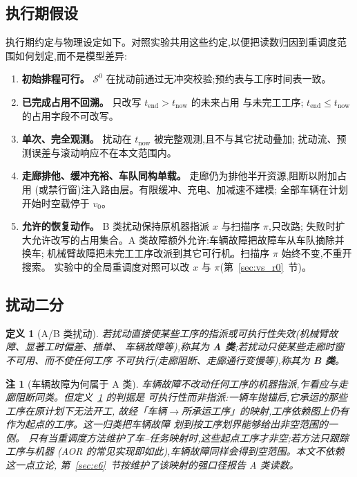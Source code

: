 \documentclass[manuscript,screen,review]{acmart}
\newtheorem{definition}{定义}
\newtheorem{remark}{注}
\begin{document}
\subsection{执行期假设}
\label{sec:assumptions}

执行期约定与物理设定如下。对照实验共用这些约定,以便把读数归因到重调度范围如何划定,而不是模型差异:

\begin{enumerate}[label=\textbf{A\arabic*.},leftmargin=*,topsep=2pt,itemsep=2pt]
\item \textbf{初始排程可行。} \(\mathcal{S}^0\) 在扰动前通过无冲突校验;预约表与工序时间表一致。
\item \textbf{已完成占用不回溯。} 只改写 \(t_{\mathrm{end}}>t_{\mathrm{now}}\) 的未来占用
与未完工工序; \(t_{\mathrm{end}}\le t_{\mathrm{now}}\) 的占用字段不可改写。
\item \textbf{单次、完全观测。} 扰动在 \(t_{\mathrm{now}}\) 被完整观测,且不与其它扰动叠加;
扰动流、预测误差与滚动响应不在本文范围内。
\item \textbf{走廊排他、缓冲充裕、车队同构单载。} 走廊仍为排他半开资源,阻断以附加占用
(或禁行窗)注入路由层。有限缓冲、充电、加减速不建模;
全部车辆在计划开始时空载停于 \(v_0\)。
\item \textbf{允许的恢复动作。} B 类扰动保持原机器指派 \(x\) 与扫描序 \(\pi\),只改路;
失败时扩大允许改写的占用集合。A 类故障额外允许:车辆故障把故障车从车队摘除并换车;
机械臂故障把未完工工序改派到其它可行机。扫描序 \(\pi\) 始终不变,不重开搜索。
实验中的全局重调度对照可以改 \(x\) 与 \(\pi\)(第~\ref{sec:vs_r0}~节)。
\end{enumerate}

\subsection{扰动二分}
\label{sec:disturbance_classes}

\begin{definition}[A/B 类扰动]
\label{def:ab}
若扰动直接使某些工序的指派或\emph{可执行性}失效(机械臂故障、显著工时偏差、插单、
车辆故障等),称其为 \textbf{A 类};若扰动只使某些走廊时窗不可用、而不使任何工序
不可执行(走廊阻断、走廊通行变慢等),称其为 \textbf{B 类}。
\end{definition}

\begin{remark}[车辆故障为何属于 A 类]
\label{rem:agv_class}
车辆故障不改动任何工序的机器指派,乍看应与走廊阻断同类。但定义~\ref{def:ab} 的判据是
\emph{可执行性}而非指派:一辆车抛锚后,它承运的那些工序在原计划下无法开工,
故经「车辆\(\to\)所承运工序」的映射,工序依赖图上仍有作为起点的工序。这一归类把车辆故障
划到按工序划界能够给出非空范围的一侧。
只有当重调度方法维护了车--任务映射时,这些起点工序才非空;若方法只跟踪工序与机器
(AOR 的常见实现即如此),车辆故障同样会得到空范围。本文不依赖这一点立论,
第~\ref{sec:e6}~节按维护了该映射的强口径报告 A 类读数。
\end{remark}
\end{document}
